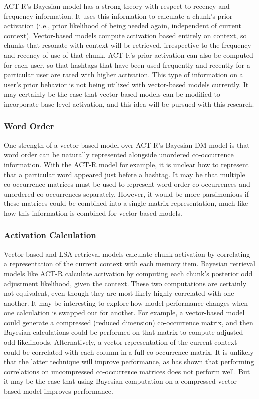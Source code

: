 \documentclass[man,floatsintext,donotrepeattitle]{apa6}
\begin{document}
ACT-R's Bayesian model has a strong theory with respect to recency and frequency information.
It uses this information to calculate a chunk's prior activation (i.e., prior likelihood of being needed again, independent of current context).
Vector-based models compute activation based entirely on context, so chunks that resonate with context will be retrieved, irrespective to the frequency and recency of use of that chunk.
ACT-R's prior activation can also be computed for each user, so that hashtags that have been used frequently and recently for a particular user are rated with higher activation.
This type of information on a user's prior behavior is not being utilized with vector-based models currently.
It may certainly be the case that vector-based models can be modified to incorporate base-level activation, and this idea will be pursued with this research.

\subsubsection{Word Order}

One strength of a vector-based model over ACT-R's Bayesian DM model is that word order can be naturally represented alongside unordered co-occurrence information.
With the ACT-R model for example, it is unclear how to represent that a particular word appeared just before a hashtag. 
It may be that multiple co-occurrence matrices must be used to represent word-order co-occurrences and unordered co-occurrences separately.
However, it would be more parsimonious if these matrices could be combined into a single matrix representation, much like how this information is combined for vector-based models.

\subsubsection{Activation Calculation}

Vector-based and LSA retrieval models calculate chunk activation by correlating a representation of the current context with each memory item.
Bayesian retrieval models like ACT-R calculate activation by computing each chunk's posterior odd adjustment likelihood, given the context.
These two computations are certainly not equivalent, even though they are most likely highly correlated with one another.
It may be interesting to explore how model performance changes when one calculation is swapped out for another.
For example, a vector-based model could generate a compressed (reduced dimension) co-occurrence matrix, and then Bayesian calculations could be performed on that matrix to compute adjusted odd likelihoods.
Alternatively, a vector representation of the current context could be correlated with each column in a full co-occurrence matrix.
It is unlikely that the latter technique will improve performance, as \textcite{Landauer1997} has shown that performing correlations on uncompressed co-occurrence matrices does not perform well.
But it may be the case that using Bayesian computation on a compressed vector-based model improves performance.
\end{document}
